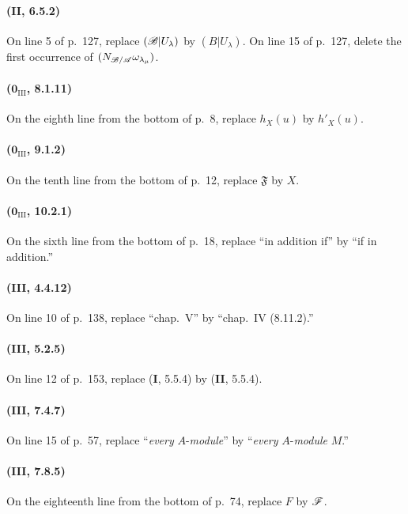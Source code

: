 \paragraph{(\textbf{II}, 6.5.2)}
On line 5 of p.~127, replace $(\mathscr{B}|U_\lambda)$ by $(B|U_\lambda)$.
On line 15 of p.~127, delete the first occurrence of
$(N_{\mathscr{B}/\mathscr{A}}\omega_{\lambda_\mu})$.

\paragraph{($\mathbf{0}_{\mathrm{III}}$, 8.1.11)}
On the eighth line from the bottom of p.~8, replace $h_X(u)$ by
$h'_X(u)$.

\paragraph{($\mathbf{0}_{\mathrm{III}}$, 9.1.2)}
On the tenth line from the bottom of p.~12, replace $\mathfrak{F}$ by $X$.

\paragraph{($\mathbf{0}_{\mathrm{III}}$, 10.2.1)}
On the sixth line from the bottom of p.~18, replace ``in addition if''
by ``if in addition.''

\paragraph{(\textbf{III}, 4.4.12)}
On line 10 of p.~138, replace ``chap.~V'' by ``chap.~IV (8.11.2).''

\paragraph{(\textbf{III}, 5.2.5)}
On line 12 of p.~153, replace (\textbf{I}, 5.5.4) by (\textbf{II}, 5.5.4).

\paragraph{(\textbf{III}, 7.4.7)}
On line 15 of p.~57, replace ``\emph{every} $A$-\emph{module}'' by
``\emph{every} $A$-\emph{module} $M$.''

\paragraph{(\textbf{III}, 7.8.5)}
On the eighteenth line from the bottom of p.~74, replace $F$ by $\mathscr{F}$.

